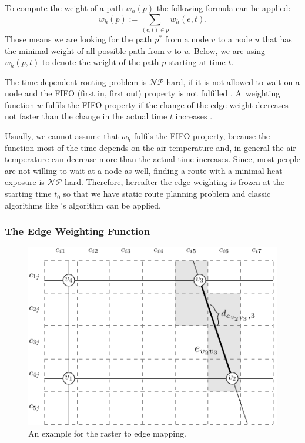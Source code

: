 To compute the weight of a path $w_h(p)$ the following formula can be applied:
	\begin{equation}\label{eq:path-weight}
		w_h(p) := \sum_{(e,t) \in p} w_h(e, t).
	\end{equation}
Those means we are looking for the path $p^*$ from a node $v$ to a node $u$ that has the minimal weight of all possible path from $v$ to $u$. Below, we are using $w_h(p, t)$ to denote the weight of the path $p$ starting at time $t$. 

The time-dependent routing problem is $\mathcal{NP}$-hard, if it is not allowed to wait on a node and the FIFO (first in, first out) property is not fulfilled \parencite{Orda1990}. A~weighting function $w$ fulfils the FIFO property if the change of the edge weight decreases not faster than the change in the actual time $t$ increases \parencite{Kaufman1993}. 

Usually, we cannot assume that $w_h$ fulfils the FIFO property, because the function most of the time depends on the air temperature and, in general the air temperature can decrease more than the actual time increases. Since, most people are not willing to wait at a node as well, finding a route with a minimal heat exposure is $\mathcal{NP}$-hard.
Therefore, hereafter the edge weighting is frozen at the starting time $t_0$ so that we have static route planning problem and classic algorithms like  \citeauthor{Dijkstra1959}'s algorithm \parencite{Dijkstra1959} can be applied. 

\subsubsection{The Edge Weighting Function \label{sec:edge-weighting}}

\begin{figure}
	\centering
	\includegraphics{figures/raster-edge-mapping-standalone}
	\caption[Example for the raster to edge mapping]{An 
		example for the raster to edge mapping.}
	\label{fig:raster-edge-mapping}
\end{figure}

